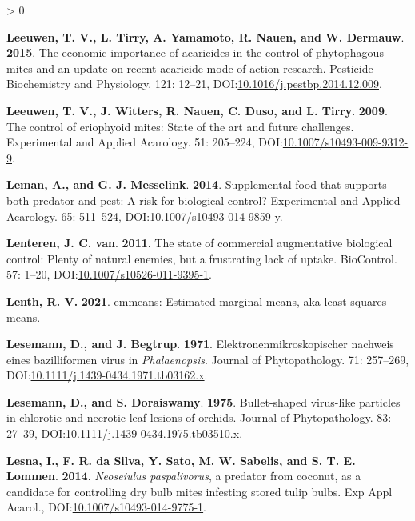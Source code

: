 \documentclass{ufdissertation}[overrideChapters] %
\newlength{\cslhangindent}
\newenvironment{CSLReferences}[2] %
 {%
  \setlength{\parindent}{0pt}
  \ifodd #1 \everypar{\setlength{\hangindent}{\cslhangindent}}\ignorespaces\fi
  \ifnum #2 > 0
  \setlength{\parskip}{#2\baselineskip}
  \fi
 }%
 {}
\begin{document}
{\begin{CSLReferences}{1}{1}
\leavevmode{}%
\textbf{Leeuwen, T. V., L. Tirry, A. Yamamoto, R. Nauen, and W. Dermauw}. \textbf{2015}. The economic importance of acaricides in the control of phytophagous mites and an update on recent acaricide mode of action research. Pesticide Biochemistry and Physiology. 121: 12--21, DOI:\href{https://doi.org/10.1016/j.pestbp.2014.12.009}{10.1016/j.pestbp.2014.12.009}.

\leavevmode{}%
\textbf{Leeuwen, T. V., J. Witters, R. Nauen, C. Duso, and L. Tirry}. \textbf{2009}. The control of eriophyoid mites: State of the art and future challenges. Experimental and Applied Acarology. 51: 205--224, DOI:\href{https://doi.org/10.1007/s10493-009-9312-9}{10.1007/s10493-009-9312-9}.

\leavevmode{}%
\textbf{Leman, A., and G. J. Messelink}. \textbf{2014}. Supplemental food that supports both predator and pest: A risk for biological control? Experimental and Applied Acarology. 65: 511--524, DOI:\href{https://doi.org/10.1007/s10493-014-9859-y}{10.1007/s10493-014-9859-y}.

\leavevmode{}%
\textbf{Lenteren, J. C. van}. \textbf{2011}. The state of commercial augmentative biological control: Plenty of natural enemies, but a frustrating lack of uptake. {BioControl}. 57: 1--20, DOI:\href{https://doi.org/10.1007/s10526-011-9395-1}{10.1007/s10526-011-9395-1}.

\leavevmode{}%
\textbf{Lenth, R. V.} \textbf{2021}. \href{https://CRAN.R-project.org/package=emmeans}{{emmeans}: Estimated marginal means, aka least-squares means}.

\leavevmode{}%
\textbf{Lesemann, D., and J. Begtrup}. \textbf{1971}. Elektronenmikroskopischer nachweis eines bazilliformen virus in {\emph{Phalaenopsis}}. Journal of Phytopathology. 71: 257--269, DOI:\href{https://doi.org/10.1111/j.1439-0434.1971.tb03162.x}{10.1111/j.1439-0434.1971.tb03162.x}.

\leavevmode{}%
\textbf{Lesemann, D., and S. Doraiswamy}. \textbf{1975}. Bullet-shaped virus-like particles in chlorotic and necrotic leaf lesions of orchids. Journal of Phytopathology. 83: 27--39, DOI:\href{https://doi.org/10.1111/j.1439-0434.1975.tb03510.x}{10.1111/j.1439-0434.1975.tb03510.x}.

\leavevmode{}%
\textbf{Lesna, I., F. R. da Silva, Y. Sato, M. W. Sabelis, and S. T. E. Lommen}. \textbf{2014}. {\emph{Neoseiulus paspalivorus}}, a predator from coconut, as a candidate for controlling dry bulb mites infesting stored tulip bulbs. Exp Appl Acarol., DOI:\href{https://doi.org/10.1007/s10493-014-9775-1}{10.1007/s10493-014-9775-1}.


\end{CSLReferences}}
\end{document}
